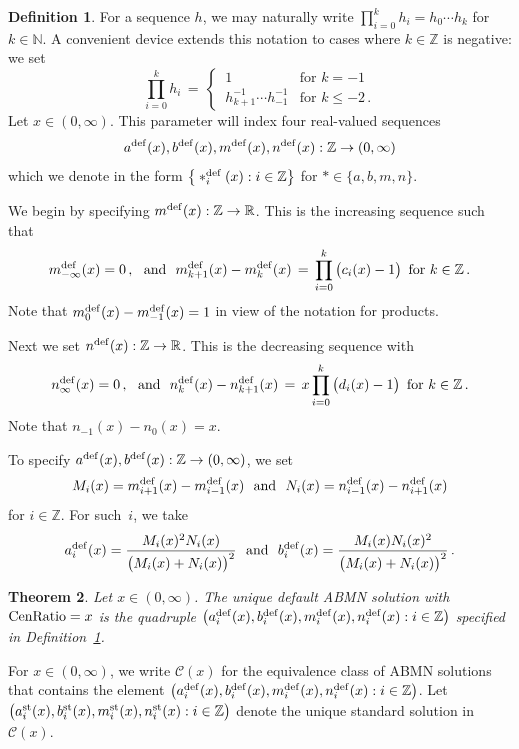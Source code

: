 \documentclass[letterpaper,11pt,oneside,reqno]{amsbook}
\newcommand{\N}{\ensuremath{\mathbb{N}}}
\newcommand{\R}{\ensuremath{\mathbb{R}}}
\newcommand{\Z}{\ensuremath{\mathbb{Z}}}
\newtheorem{theorem}{Theorem}[chapter]
\numberwithin{figure}{chapter}
\theoremstyle{definition}
\theoremstyle{definition}
\theoremstyle{definition}
\newtheorem{definition}[theorem]{Definition}
\theoremstyle{definition}
\theoremstyle{definition}
\newcommand{\mc}{\mathcal}
\newcommand{\centralratio}{{\rm CenRatio}}
\newcommand{\macsee}{c}
\newcommand{\macdee}{d}
\newcommand{\adef}{a^{\rm def}}
\newcommand{\bdef}{b^{\rm def}}
\newcommand{\mdef}{m^{\rm def}}
\newcommand{\ndef}{n^{\rm def}}
\newcommand{\asta}{a^{\rm st}}
\newcommand{\bst}{b^{\rm st}}
\newcommand{\mst}{m^{\rm st}}
\newcommand{\nst}{n^{\rm st}}
\newcommand{\abmnmacspace}{\textrm{ABMN} }
\begin{document}
\begin{definition}\label{d.zdefault}
For a sequence $h$, we may naturally write $\prod_{i=0}^k h_i = h_0 \cdots h_k$ for $k \in \N$. A convenient device extends this notation to cases where $k \in \Z$ is negative: we set 
$$\prod_{i=0}^k h_i \, = \, \begin{cases}
  \, 1  &  \text{for $k=-1$} \\
 \, h_{k+1}^{-1} \cdots h_{-1}^{-1}  &  \text{for $k \leq -2$} \, .
\end{cases}
$$
Let $x \in (0,\infty)$. This parameter will index four real-valued sequences 
$$
\adef(x),\bdef(x),\mdef(x),\ndef(x):\Z \to (0,\infty)
$$ 
which we denote in the form $\big\{ *^{\rm def}_i(x): i \in \Z \big\}$ for $* \in \{a,b,m,n\}$. 

We begin by specifying $\mdef(x):\Z \to \R$. This is the increasing sequence such that 
$$
\mdef_{-\infty}(x) = 0 \, , \, \, \, \, \textrm{and} \, \, \, \, \mdef_{k+1}(x)- \mdef_k(x) \, = \, \prod_{i=0}^k \big( \macsee_i(x) - 1 \big) \, \, \,  \textrm{for $k \in \Z$} \, . 
$$
Note that $\mdef_0(x) - \mdef_{-1}(x) = 1$ in view of the notation for products. 

Next we set  $\ndef(x):\Z \to \R$. This is the decreasing sequence with 
$$
\ndef_\infty(x) = 0 \, , \, \, \, \,   \textrm{and} \, \, \, \, \ndef_k(x)- \ndef_{k+1}(x)  \, = \, x \prod_{i=0}^k \big( \macdee_i(x) - 1 \big) \, \, \,  \textrm{for $k \in \Z$} \, . 
$$
Note that $n_{-1}(x) - n_0(x) = x$.

To specify $\adef(x),\bdef(x):\Z \to (0,\infty)$, we set 
$$
M_i(x) = \mdef_{i+1}(x) - \mdef_{i-1}(x) \, \, \, \, \textrm{and} \, \, \, \, N_i(x) = \ndef_{i-1}(x) - \ndef_{i+1}(x)
$$ 
for $i \in \Z$. For such~$i$, we take 
$$
\adef_i(x) = \frac{M_i(x)^2 N_i(x)}{\big(M_i(x)+N_i(x)\big)^2} \, \, \, \, \textrm{and} \, \, \, \, 
\bdef_i(x) = \frac{M_i(x) N_i(x)^2}{\big(M_i(x)+N_i(x)\big)^2} \, .
$$
\end{definition}

\begin{theorem}\label{t.defaultexplicit}
Let $x \in (0,\infty)$.
The unique default \abmnmacspace solution with $\centralratio = x$ is the quadruple $\big( \adef_i(x),\bdef_i(x),\mdef_i(x),\ndef_i(x): i \in \Z \big)$ specified in Definition~\ref{d.zdefault}.
\end{theorem}

For $x \in (0,\infty)$, we write $\mc{C}(x)$ for the equivalence class of \abmnmacspace solutions that contains the element $\big( \adef_i(x),\bdef_i(x),\mdef_i(x),\ndef_i(x): i \in \Z \big)$. 
Let $\big(\asta_i(x),\bst_i(x),\mst_i(x),\nst_i(x) : i \in \Z \big)$ denote the unique standard solution in $\mc{C}(x)$.
\end{document}
